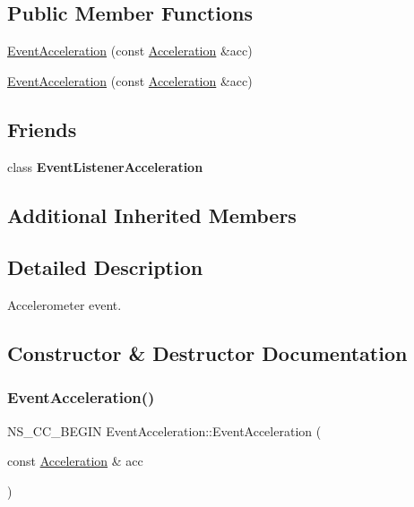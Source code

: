 \subsection*{Public Member Functions}
\begin{DoxyCompactItemize}
\item 
\hyperlink{classEventAcceleration_a221864450efe9545808c02a6b372d902}{Event\+Acceleration} (const \hyperlink{classAcceleration}{Acceleration} \&acc)
\item 
\hyperlink{classEventAcceleration_a5fd91f5b2cdac2a55c74cabb44e3398c}{Event\+Acceleration} (const \hyperlink{classAcceleration}{Acceleration} \&acc)
\end{DoxyCompactItemize}
\subsection*{Friends}
\begin{DoxyCompactItemize}
\item 
\mbox{\label{classEventAcceleration_a661e2b1b18843ab267561f6e771ff1b3}} 
class {\bfseries Event\+Listener\+Acceleration}
\end{DoxyCompactItemize}
\subsection*{Additional Inherited Members}


\subsection{Detailed Description}
Accelerometer event. 

\subsection{Constructor \& Destructor Documentation}
\mbox{\label{classEventAcceleration_a221864450efe9545808c02a6b372d902}} 
\subsubsection{\texorpdfstring{Event\+Acceleration()}{EventAcceleration()}\hspace{0.1cm}{\footnotesize\ttfamily [1/2]}}
{\footnotesize\ttfamily N\+S\+\_\+\+C\+C\+\_\+\+B\+E\+G\+IN Event\+Acceleration\+::\+Event\+Acceleration (\begin{DoxyParamCaption}\item[{const \hyperlink{classAcceleration}{Acceleration} \&}]{acc }\end{DoxyParamCaption})}

